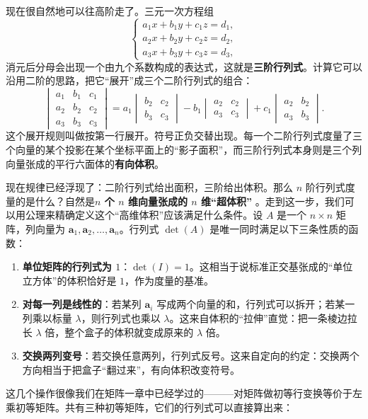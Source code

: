 \documentclass[UTF8]{ctexbook}
\begin{document}
现在很自然地可以往高阶走了。三元一次方程组
\[
\begin{cases}
a_1x+b_1y+c_1z=d_1,\\
a_2x+b_2y+c_2z=d_2,\\
a_3x+b_3y+c_3z=d_3,
\end{cases}
\]
消元后分母会出现一个由九个系数构成的表达式，这就是\textbf{三阶行列式}。计算它可以沿用二阶的思路，把它“展开”成三个二阶行列式的组合：
\[
\begin{vmatrix}
a_1 & b_1 & c_1\\
a_2 & b_2 & c_2\\
a_3 & b_3 & c_3
\end{vmatrix}
= a_1\begin{vmatrix}b_2 & c_2\\ b_3 & c_3\end{vmatrix}
- b_1\begin{vmatrix}a_2 & c_2\\ a_3 & c_3\end{vmatrix}
+ c_1\begin{vmatrix}a_2 & b_2\\ a_3 & b_3\end{vmatrix}.
\]
这个展开规则叫做按第一行展开。符号正负交替出现。每一个二阶行列式度量了三个向量的某个投影在某个坐标平面上的“影子面积”，而三阶行列式本身则是三个列向量张成的平行六面体的\textbf{有向体积}。

现在规律已经浮现了：二阶行列式给出面积，三阶给出体积。那么 $n$ 阶行列式度量的是什么？自然是\textbf{$n$ 个 $n$ 维向量张成的 $n$ 维“超体积”} 。走到这一步，我们可以用公理来精确定义这个“高维体积”应该满足什么条件。设 $A$ 是一个 $n\times n$ 矩阵，列向量为 $\mathbf{a}_1,\mathbf{a}_2,\dots,\mathbf{a}_n$。行列式 $\det(A)$ 是唯一同时满足以下三条性质的函数：

\begin{enumerate}
  \item \textbf{单位矩阵的行列式为 $1$}：$\det(I)=1$。这相当于说标准正交基张成的“单位立方体”的体积恰好是 $1$，作为度量的基准。
  \item \textbf{对每一列是线性的}：若某列 $\mathbf{a}_i$ 写成两个向量的和，行列式可以拆开；若某一列乘以标量 $\lambda$，则行列式也乘以 $\lambda$。这来自体积的“拉伸”直觉：把一条棱边拉长 $\lambda$ 倍，整个盒子的体积就变成原来的 $\lambda$ 倍。
  \item \textbf{交换两列变号}：若交换任意两列，行列式反号。这来自定向的约定：交换两个方向相当于把盒子“翻过来”，有向体积改变符号。
\end{enumerate}

这几个操作很像我们在矩阵一章中已经学过的———对矩阵做初等行变换等价于左乘初等矩阵。共有三种初等矩阵，它们的行列式可以直接算出来：
\end{document}
